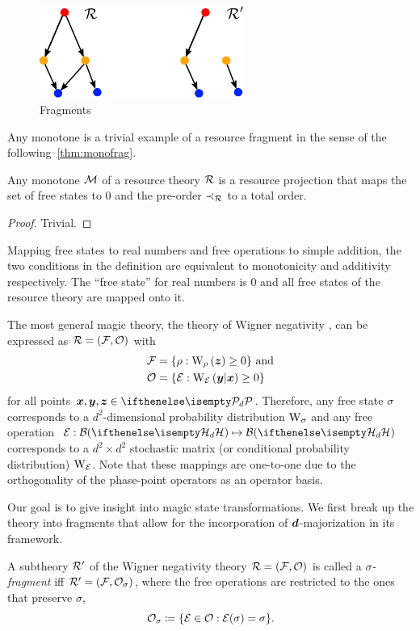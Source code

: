 \begin{figure}
    \centering
    \includegraphics[height=3cm]{sections/major/fragments.pdf}
    \caption{Fragments 
    }
    \label{fig:fragments}
\end{figure}

Any monotone is a trivial example of a resource fragment in the sense of the following~\cref{thm:monofrag}.
\begin{proposition}\label{thm:monofrag}
	Any monotone $\cal{M}$ of a resource theory $\R$ is a resource projection that maps the set of free states to $0$ and the pre-order $\prec_\R$ to a total order.
\end{proposition}
\begin{proof}
	Trivial.
\end{proof}
Mapping free states to real numbers and free operations to simple addition, the two conditions in the definition are equivalent to monotonicity and additivity respectively.
The ``free state'' for real numbers is 0 and all free states of the resource theory are mapped onto it.

The most general magic theory, the theory of Wigner negativity , can be expressed as $\R = (\F, \O)$ with
\begin{align}
    \F &= \{ \rho: \W[\bmz]{\rho} \geq 0\}\ \text{and} \\
    \O &= \{ \E: \W[\bmy|\bmx]{\E} \geq 0\}
\end{align}
for all points $\bmx, \bmy, \bmz \in \pd$.
Therefore, any free state $\sigma$ corresponds to a $d^2$-dimensional probability distribution $\W{\sigma}$ and any free operation $\E: \cal{B}(\hd) \mapsto \cal{B}(\hd)$ corresponds to a $d^2 \times d^2$ stochastic matrix (or conditional probability distribution) $\W{\E}$.
Note that these mappings are one-to-one due to the orthogonality of the phase-point operators as an operator basis.

Our goal is to give insight into magic state transformations.
We first break up the theory into fragments that allow for the incorporation of $\bmd$-majorization in its framework.
\begin{definition}\label{def:sigmafrag}
    A subtheory $\R'$ of the Wigner negativity theory $\R = (\F, \O)$ is called a \emph{$\sigma$-fragment} iff $\R' = (\F, \O_\sigma)$, where the free operations are restricted to the ones that preserve $\sigma$,
    \begin{equation}
        \O_\sigma \coloneqq \{ \E \in \O: \E(\sigma) = \sigma \}.
    \end{equation}
\end{definition}

